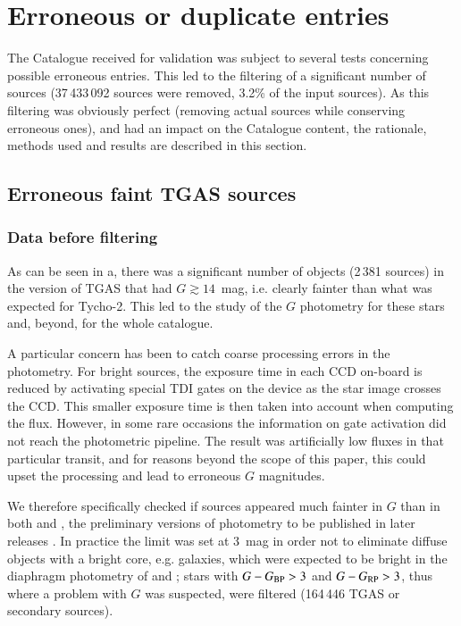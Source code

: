 \section{Erroneous or duplicate entries}\label{sec:wp942:dupes}

The {} Catalogue received for validation was subject to several tests
concerning possible erroneous entries. This led to the filtering of a 
significant number of sources (37\,433\,092 sources were removed, 
3.2\% of the input sources).
As this filtering was obviously   perfect (removing actual sources 
while conserving erroneous ones), and had an impact on the Catalogue
content, the rationale, methods used and results are described in this section.

\subsection{Erroneous faint TGAS sources}

\subsubsection{Data before filtering}\label{sec:wp942:photofilter}

As can be seen in a, there was a significant number 
of objects (2\,381 sources) in the {} version of TGAS 
that had $G\gtrsim 14$~mag,
i.e. clearly fainter than what was expected for Tycho-2. This led to the study
of the $G$ photometry for these stars and, beyond, for the whole catalogue.

A particular concern has been to catch coarse processing errors in the photometry.
For bright sources, the exposure time in each CCD on-board {\gaia} is reduced by activating
special TDI gates on the device as the star image crosses the CCD. This smaller exposure
time is then taken into account when computing the flux. However, in some rare occasions 
the information on gate activation did not
reach the photometric pipeline. The result was artificially low fluxes in that
particular transit, and for reasons beyond the scope of this paper, this
could upset the processing and lead to erroneous $G$ magnitudes. 

We therefore specifically checked if sources appeared much fainter 
in $G$ than in both {\gbp} and {\grp}, the preliminary 
versions of photometry to be published in later releases \citep{DPACP-10}. 
In practice the limit was set
at 3~mag in order not to eliminate diffuse objects with a bright core,
e.g. galaxies, which were expected to be bright in the diaphragm photometry
of {\gbp} and {\grp}; stars with $G-G_{\rm BP} > 3$ and $G-G_{\rm RP} > 3$, 
thus where a problem with $G$ was suspected, were filtered (164\,446 TGAS or 
secondary sources).

